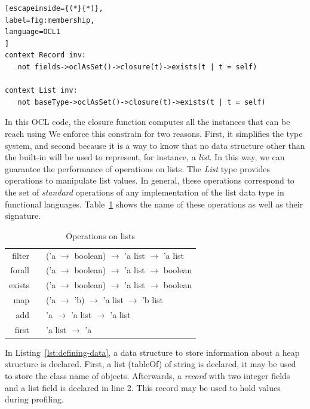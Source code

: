 \begin{lstlisting}[escapeinside={(*}{*)},
label=fig:membership,
language=OCL1
]
context Record inv: 
   not fields->oclAsSet()->closure(t)->exists(t | t = self)

context List inv:
   not baseType->oclAsSet()->closure(t)->exists(t | t = self)
\end{lstlisting} 

In this OCL code, the closure function computes all the instances that can be reach using
We enforce this constrain for two reasons. First, it simplifies the type system, and second because it is a way to know that no data structure other than the built-in will be used to represent, for instance, a \textit{list}.
In this way, we can guarantee the performance of operations on lists.  
The \textit{List} type provides operations to manipulate list values.
In general, these operations correspond to the set of \textit{standard} operations of any implementation of the list data type in functional languages.
Table~\ref{tab:operations-on-lists} shows the name of these operations as well as their signature.

\begin{table}[!ht]
\centering
\begin{tabular}{r p{0.5cm} l}
\hline
\hline filter & & ('a $\to$ boolean) $\to$ 'a list $\to$ 'a list \\ 
forall & & ('a $\to$ boolean) $\to$ 'a list $\to$ boolean \\ 
exists & & ('a $\to$ boolean) $\to$ 'a list $\to$ boolean \\ 
map & & ('a $\to$ 'b) $\to$ 'a list $\to$ 'b list \\ 
add & & 'a $\to$ 'a list $\to$ 'a list \\ 
first & & 'a list $\to$ 'a \\
\hline 
\end{tabular} 
\caption{Operations on lists} \label{tab:operations-on-lists}
\end{table} 

In Listing~\ref{lst:defining-data}, a data structure to store information about a heap structure is declared.
First, a list (tableOf) of string is declared, it may be used to store the class name of objects.
Afterwards, a \textit{record} with two integer fields and a list field is declared in line 2.
This record may be used to hold values during profiling.

